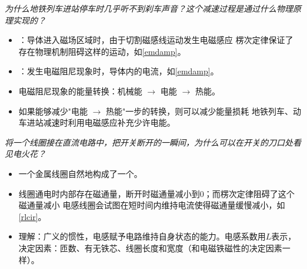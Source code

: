 \documentclass[a4paper,9pt]{ctexart}
\begin{document}
\par
\emph{为什么地铁列车进站停车时几乎听不到刹车声音？这个减速过程是通过什么物理原理实现的？}
\begin{itemize}
\item
{}：导体进入磁场区域时，由于切割磁感线运动发生电磁感应 \so 楞次定律保证了存在物理机制阻碍这样的运动，如\cref{emdamp}。
\item
{}：发生电磁阻尼现象时，导体内的电流，如\cref{emdamp}。
\item
电磁阻尼现象的能量转换：机械能 $\to$ 电能 $\to$ 热能。
\item
如果能够减少"电能 $\to$ 热能"一步的转换，则可以减少能量损耗 \so 地铁列车、动车进站减速时利用电磁感应补充少许电能。
\end{itemize}
\par
\emph{将一个线圈接在直流电路中，把开关断开的一瞬间，为什么可以在开关的刀口处看见电火花？}
\begin{itemize}
\item
一个金属线圈自然地构成了一个。
\item
线圈通电时内部存在磁通量，断开时磁通量减小到0；而楞次定律阻碍了这个磁通量减小 \so 电感线圈会试图在短时间内维持电流使得磁通量缓慢减小，如\cref{rlcir}。
\item
理解：广义的惯性，电感赋予电路维持自身状态的能力。电感系数用$L$表示，决定因素：匝数、有无铁芯、线圈长度和宽度（和电磁铁磁性的决定因素一样）。
\end{itemize}
 
\end{document}
